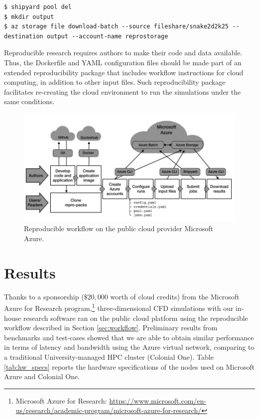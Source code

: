 \documentclass[10pt,journal,compsoc]{IEEEtran}
\begin{document}
\begin{lstlisting}
$ shipyard pool del
$ mkdir output
$ az storage file download-batch --source fileshare/snake2d2k25 --destination output --account-name reprostorage
\end{lstlisting}

Reproducible research requires authors to make their code and data available.
Thus, the Dockerfile and YAML configuration files should be made part of an extended reproducibility package that includes workflow instructions for cloud computing, in addition to other input files.
Such reproducibility package facilitates re-creating the cloud environment to run the simulations under the same conditions.

\begin{figure}[!h]
    \centering
    \includegraphics[width=14cm]{figures/cloud_workflow.png}
    \caption{Reproducible workflow on the public cloud provider Microsoft Azure.}
    \label{fig:cloud_workflow}
\end{figure}

\section{Results}\label{sec:results}

Thanks to a sponsorship ($\$20,000$ worth of cloud credits) from the Microsoft Azure for Research program,\footnote{Microsoft Azure for Research: \url{https://www.microsoft.com/en-us/research/academic-program/microsoft-azure-for-research/}} three-dimensional CFD simulations with our in-house research software ran on the public cloud platform using the reproducible workflow described in Section \ref{sec:workflow}.
Preliminary results from benchmarks and test-cases showed that we are able to obtain similar performance in terms of latency and bandwidth using the Azure virtual network, comparing to a traditional University-managed HPC cluster (Colonial One).
Table \ref{tab:hw_specs} reports the hardware specifications of the nodes used on Microsoft Azure and Colonial One.
\end{document}
